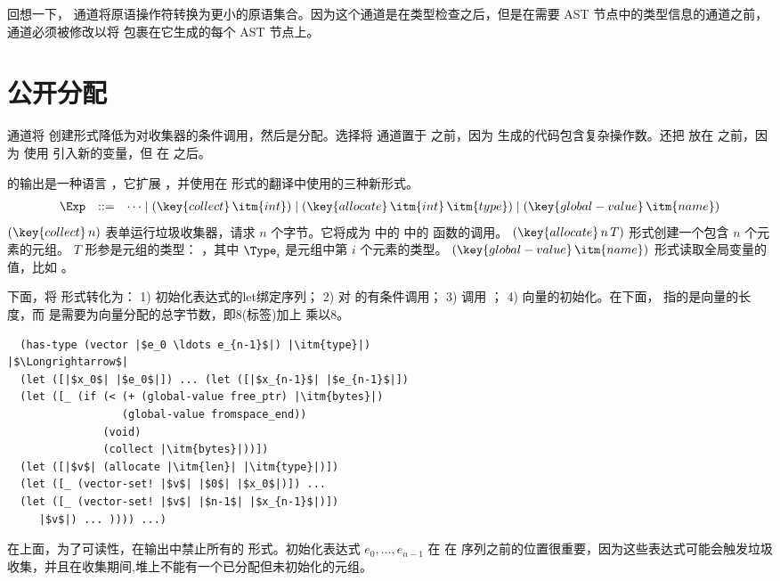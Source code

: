 \documentclass[11pt]{book}
\begin{document}
回想一下，  通道将原语操作符转换为更小的原语集合。因为这个通道是在类型检查之后，但是在需要  AST 节点中的类型信息的通道之前，  通道必须被修改以将  包裹在它生成的每个 AST 节点上。


\section{公开分配}
\label{sec:expose-allocation}

  通道将  创建形式降低为对收集器的条件调用，然后是分配。选择将  通道置于  之前，因为
 生成的代码包含复杂操作数。还把
 放在  之前，因为
 使用  引入新的变量，但  在  之后。

  的输出是一种语言 \LangAlloc{} ，它扩展 \LangVec{} ，并使用在  形式的翻译中使用的三种新形式。
\[
\begin{array}{lcl}
  \Exp &::=& \cdots
      \mid (\key{collect} \,\itm{int})
      \mid (\key{allocate} \,\itm{int}\,\itm{type})
      \mid (\key{global-value} \,\itm{name})
\end{array}
\]
 $(\key{collect}\,n)$ 表单运行垃圾收集器，请求
$n$ 个字节。它将成为  中的  中的  函数的调用。
$(\key{allocate}\,n\,T)$ 形式创建一个包含 $n$ 个元素的元组。
 $T$ 形参是元组的类型：  ，其中 $\Type_i$ 是元组中第 $i$ 个元素的类型。 $(\key{global-value}\,\itm{name})$ 形式读取全局变量的值，比如  。

下面，将 
形式转化为： 1) 初始化表达式的let绑定序列； 2) 对  的有条件调用； 3) 调用
 ；  4) 向量的初始化。在下面，  指的是向量的长度，而
 是需要为向量分配的总字节数，即8(标签)加上  乘以8。
\begin{lstlisting}
  (has-type (vector |$e_0 \ldots e_{n-1}$|) |\itm{type}|)
|$\Longrightarrow$|
  (let ([|$x_0$| |$e_0$|]) ... (let ([|$x_{n-1}$| |$e_{n-1}$|])
  (let ([_ (if (< (+ (global-value free_ptr) |\itm{bytes}|)
                  (global-value fromspace_end))
               (void)
               (collect |\itm{bytes}|))])
  (let ([|$v$| (allocate |\itm{len}| |\itm{type}|)])
  (let ([_ (vector-set! |$v$| |$0$| |$x_0$|)]) ...
  (let ([_ (vector-set! |$v$| |$n-1$| |$x_{n-1}$|)])
     |$v$|) ... )))) ...)
\end{lstlisting}
在上面，为了可读性，在输出中禁止所有的  形式。初始化表达式 $e_0,\ldots,e_{n-1}$ 在  在  序列之前的位置很重要，因为这些表达式可能会触发垃圾收集，并且在收集期间,堆上不能有一个已分配但未初始化的元组。
\end{document}
